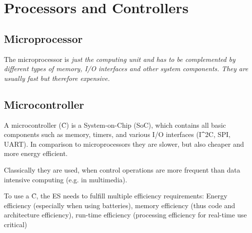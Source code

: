 \section{Processors and Controllers}
\subsection{Microprocessor}
The microprocessor is \it{just} the computing unit and has to be complemented by different types of memory, I/O interfaces and other system components. They are usually fast but therefore expensive.

\subsection{Microcontroller}
A microcontroller (\f{\mu C}) is a System-on-Chip (SoC), which contains all basic components such as memory, timers, and various I/O interfaces (I\f{^2}C, SPI, UART). In comparison to microprocessors they are slower, but also cheaper and more energy efficient.

Classically they are used, when control operations are more frequent than data intensive computing (e.g. in multimedia).
\newline

To use a \f{\mu C}, the ES needs to fulfill multiple efficiency requirements: Energy efficiency (especially when using batteries), memory efficiency (thus code and architecture efficiency), run-time efficiency (processing efficiency for real-time use critical)